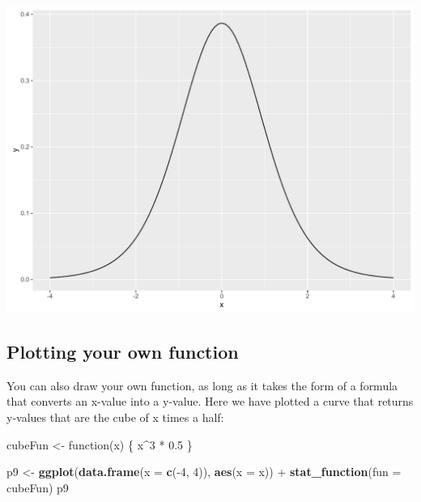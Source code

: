 \documentclass[]{article}
\newenvironment{Shaded}{\begin{snugshade}}{\end{snugshade}}
\newcommand{\KeywordTok}[1]{\textcolor[rgb]{0.13,0.29,0.53}{\textbf{{#1}}}}
\newcommand{\DataTypeTok}[1]{\textcolor[rgb]{0.13,0.29,0.53}{{#1}}}
\newcommand{\DecValTok}[1]{\textcolor[rgb]{0.00,0.00,0.81}{{#1}}}
\newcommand{\FloatTok}[1]{\textcolor[rgb]{0.00,0.00,0.81}{{#1}}}
\newcommand{\StringTok}[1]{\textcolor[rgb]{0.31,0.60,0.02}{{#1}}}
\newcommand{\NormalTok}[1]{{#1}}
\begin{document}
\begin{center}\includegraphics{0_all_posts_pdf/function_2-1} \end{center}

\subsection{Plotting your own
function}\label{plotting-your-own-function}

You can also draw your own function, as long as it takes the form of a
formula that converts an x-value into a y-value. Here we have plotted a
curve that returns y-values that are the cube of x times a half:

\begin{Shaded}
\begin{Highlighting}[]
\NormalTok{cubeFun <-}\StringTok{ }\NormalTok{function(x) \{}
    \NormalTok{x^}\DecValTok{3} \NormalTok{*}\StringTok{ }\FloatTok{0.5}
\NormalTok{\}}

\NormalTok{p9 <-}\StringTok{ }\KeywordTok{ggplot}\NormalTok{(}\KeywordTok{data.frame}\NormalTok{(}\DataTypeTok{x =} \KeywordTok{c}\NormalTok{(-}\DecValTok{4}\NormalTok{, }\DecValTok{4}\NormalTok{)), }\KeywordTok{aes}\NormalTok{(}\DataTypeTok{x =} \NormalTok{x)) +}
\StringTok{      }\KeywordTok{stat_function}\NormalTok{(}\DataTypeTok{fun =} \NormalTok{cubeFun)}
\NormalTok{p9}
\end{Highlighting}
\end{Shaded}
\end{document}
